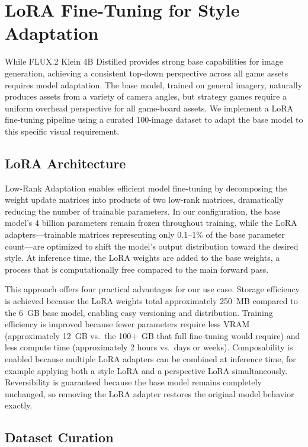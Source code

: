 \documentclass[conference]{IEEEtran}
\begin{document}
\section{LoRA Fine-Tuning for Style Adaptation}
\label{sec:lora}

While FLUX.2 Klein 4B Distilled provides strong base capabilities for image generation, achieving a consistent top-down perspective across all game assets requires model adaptation. The base model, trained on general imagery, naturally produces assets from a variety of camera angles, but strategy games require a uniform overhead perspective for all game-board assets. We implement a LoRA fine-tuning pipeline using a curated 100-image dataset to adapt the base model to this specific visual requirement.

\subsection{LoRA Architecture}

Low-Rank Adaptation enables efficient model fine-tuning by decomposing the weight update matrices into products of two low-rank matrices, dramatically reducing the number of trainable parameters. In our configuration, the base model's 4 billion parameters remain frozen throughout training, while the LoRA adapters---trainable matrices representing only 0.1--1\% of the base parameter count---are optimized to shift the model's output distribution toward the desired style. At inference time, the LoRA weights are added to the base weights, a process that is computationally free compared to the main forward pass.

This approach offers four practical advantages for our use case. Storage efficiency is achieved because the LoRA weights total approximately 250~MB compared to the 6~GB base model, enabling easy versioning and distribution. Training efficiency is improved because fewer parameters require less VRAM (approximately 12~GB vs.\ the 100+~GB that full fine-tuning would require) and less compute time (approximately 2 hours vs.\ days or weeks). Composability is enabled because multiple LoRA adapters can be combined at inference time, for example applying both a style LoRA and a perspective LoRA simultaneously. Reversibility is guaranteed because the base model remains completely unchanged, so removing the LoRA adapter restores the original model behavior exactly.

\subsection{Dataset Curation}
\end{document}
